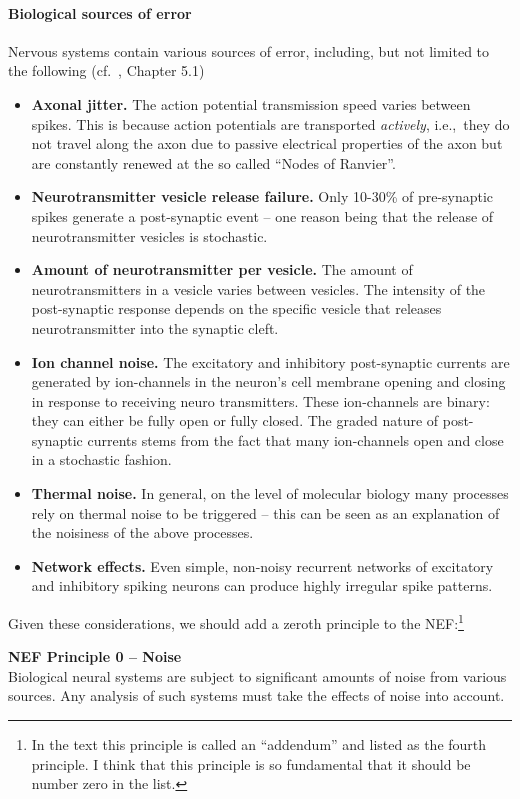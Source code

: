 \documentclass[10pt,letterpaper,oneside]{article}
\begin{document}
\paragraph{Biological sources of error}
Nervous systems contain various sources of error, including, but not limited to the following (cf.~\cite{gerstner2002spiking}, Chapter 5.1)
\begin{itemize}
	\item \textbf{Axonal jitter.}
	The action potential transmission speed varies between spikes. This is because action potentials are transported \emph{actively}, i.e.,~they do not travel along the axon due to passive electrical properties of the axon but are constantly renewed at the so called \enquote{Nodes of Ranvier}.
	\item \textbf{Neurotransmitter vesicle release failure.}
	Only 10-30\% of pre-synaptic spikes generate a post-synaptic event -- one reason being that the release of neurotransmitter vesicles is stochastic.
	\item \textbf{Amount of neurotransmitter per vesicle.}
	The amount of neurotransmitters in a vesicle varies between vesicles. The intensity of the post-synaptic response depends on the specific vesicle that releases neurotransmitter into the synaptic cleft.
	\item \textbf{Ion channel noise.}
	The excitatory and inhibitory post-synaptic currents are generated by ion-channels in the neuron's cell membrane opening and closing in response to receiving neuro transmitters. These ion-channels are binary: they can either be fully open or fully closed. The graded nature of post-synaptic currents stems from the fact that many ion-channels open and close in a stochastic fashion.
	\item \textbf{Thermal noise.}
	In general, on the level of molecular biology many processes rely on thermal noise to be triggered -- this can be seen as an explanation of the noisiness of the above processes.
	\item \textbf{Network effects.}
	Even simple, non-noisy recurrent networks of excitatory and inhibitory spiking neurons can produce highly irregular spike patterns.
\end{itemize}

Given these considerations, we should add a zeroth principle to the NEF:\footnote{In the text this principle is called an \enquote{addendum} and listed as the fourth principle. I think that this principle is so fundamental that it should be number zero in the list.}
\begin{mdframed}
	\textbf{NEF Principle 0 -- Noise}\\
	Biological neural systems are subject to significant amounts of noise from various sources. Any analysis of such systems must take the effects of noise into account.
\end{mdframed}
\end{document}
